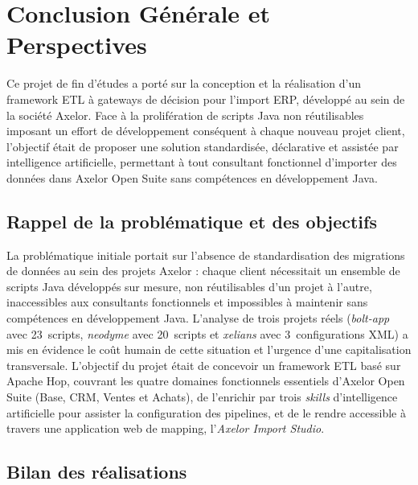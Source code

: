 \chapter*{Conclusion Générale et Perspectives}

\vspace{0.5cm}

Ce projet de fin d'études a porté sur la conception et la réalisation d'un framework ETL à gateways de décision pour l'import ERP, développé au sein de la société Axelor. Face à la prolifération de scripts Java non réutilisables imposant un effort de développement conséquent à chaque nouveau projet client, l'objectif était de proposer une solution standardisée, déclarative et assistée par intelligence artificielle, permettant à tout consultant fonctionnel d'importer des données dans Axelor Open Suite sans compétences en développement Java.

\section*{Rappel de la problématique et des objectifs}

La problématique initiale portait sur l'absence de standardisation des migrations de données au sein des projets Axelor : chaque client nécessitait un ensemble de scripts Java développés sur mesure, non réutilisables d'un projet à l'autre, inaccessibles aux consultants fonctionnels et impossibles à maintenir sans compétences en développement Java. L'analyse de trois projets réels (\textit{bolt-app} avec 23~scripts, \textit{neodyme} avec 20~scripts et \textit{xelians} avec 3~configurations XML) a mis en évidence le coût humain de cette situation et l'urgence d'une capitalisation transversale.
L'objectif du projet était de concevoir un framework ETL basé sur Apache Hop, couvrant les quatre domaines fonctionnels essentiels d'Axelor Open Suite (Base, CRM, Ventes et Achats), de l'enrichir par trois \textit{skills} d'intelligence artificielle pour assister la configuration des pipelines, et de le rendre accessible à travers une application web de mapping, l'\textit{Axelor Import Studio}.

\section*{Bilan des réalisations}

